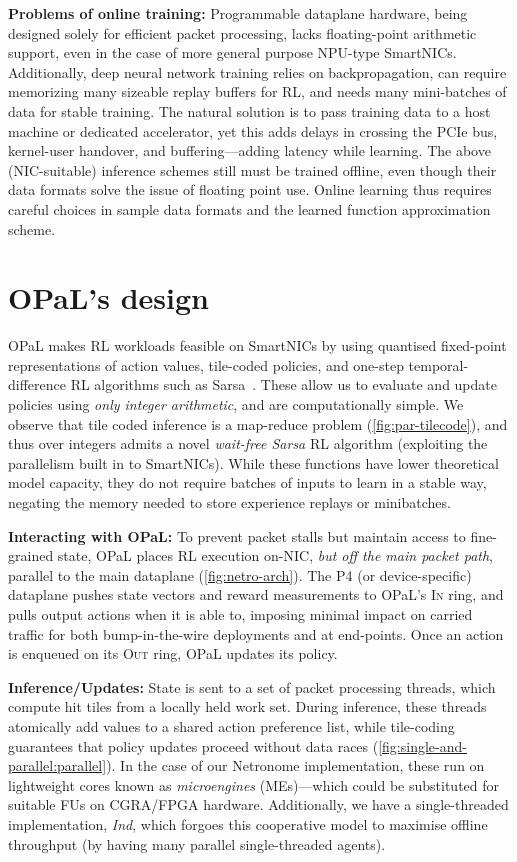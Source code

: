 \documentclass[
sigconf,natbib=false
]{acmart}
\newcommand{\fakepara}[1]{\noindent\textbf{#1:}}
\newcommand{\approachshort}{OPaL}
\newcommand{\Indfw}{\emph{Ind}}
\newcommand{\indfw}{\Indfw}
\newcommand{\inring}{\textsc{In}}
\newcommand{\outring}{\textsc{Out}}
\begin{document}
\fakepara{Problems of online training}
Programmable dataplane hardware, being designed solely for efficient packet processing, lacks floating-point arithmetic support, even in the case of more general purpose NPU-type SmartNICs.
Additionally, deep neural network training relies on backpropagation, can require memorizing many sizeable replay buffers for RL, and needs many mini-batches of data for stable training.
The natural solution is to pass training data to a host machine or dedicated accelerator, yet this adds delays in crossing the PCIe bus, kernel-user handover, and buffering---adding latency while learning.
The above (NIC-suitable) inference schemes still must be trained offline, even though their data formats solve the issue of floating point use.
Online learning thus requires careful choices in sample data formats and the learned function approximation scheme.

\section{\approachshort{}'s design}
\approachshort{} makes RL workloads feasible on SmartNICs by using quantised fixed-point representations of action values, tile-coded policies, and one-step temporal-difference RL algorithms such as Sarsa~\parencite{RL2E}.
These allow us to evaluate and update policies using \emph{only integer arithmetic}, and are computationally simple.
We observe that tile coded inference is a map-reduce problem (\cref{fig:par-tilecode}), and thus over integers admits a novel \emph{wait-free Sarsa} RL algorithm (exploiting the parallelism built in to SmartNICs).
While these functions have lower theoretical model capacity, they do not require batches of inputs to learn in a stable way, negating the memory needed to store experience replays or minibatches.

\fakepara{Interacting with \approachshort{}}
To prevent packet stalls but maintain access to fine-grained state, \approachshort{} places RL execution on-NIC, \emph{but off the main packet path}, parallel to the main dataplane (\cref{fig:netro-arch}).
The P4 (or device-specific) dataplane pushes state vectors and reward measurements to \approachshort{}'s \inring{} ring, and pulls output actions when it is able to, imposing minimal impact on carried traffic for both bump-in-the-wire deployments and at end-points.
Once an action is enqueued on its \outring{} ring, \approachshort{} updates its policy.

\fakepara{Inference/Updates}
State is sent to a set of packet processing threads, which compute hit tiles from a locally held work set.
During inference, these threads atomically add values to a shared action preference list, while tile-coding guarantees that policy updates proceed without data races (\cref{fig:single-and-parallel:parallel}).
In the case of our Netronome implementation, these run on lightweight cores known as \emph{microengines} (MEs)---which could be substituted for suitable FUs on CGRA/FPGA hardware.
Additionally, we have a single-threaded implementation, \indfw, which forgoes this cooperative model to maximise offline throughput (by having many parallel single-threaded agents).
\end{document}
